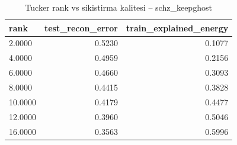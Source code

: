 \begin{table}[htbp]
  \centering
  \caption{Tucker rank vs sikistirma kalitesi -- schz\_keepghost}
  \label{tab:compression_schz_keepghost}
  \small
  \begin{tabular}{lrr}
    \toprule
    rank & test\_recon\_error & train\_explained\_energy \\
    \midrule
    2.0000 & 0.5230 & 0.1077 \\
    4.0000 & 0.4959 & 0.2156 \\
    6.0000 & 0.4660 & 0.3093 \\
    8.0000 & 0.4415 & 0.3828 \\
    10.0000 & 0.4179 & 0.4477 \\
    12.0000 & 0.3960 & 0.5046 \\
    16.0000 & 0.3563 & 0.5996 \\
    \bottomrule
  \end{tabular}
\end{table}
